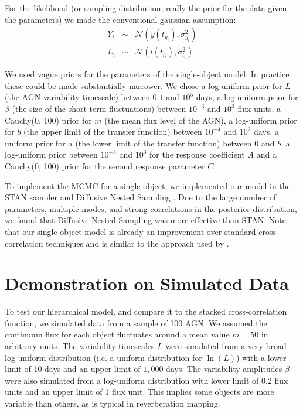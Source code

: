\documentclass[useAMS,usenatbib]{mn2e}
\begin{document}
For the likelihood (or sampling distribution, really the prior for the data
given the parameters) we made the conventional gaussian assumption:
\begin{eqnarray}
Y_i &\sim& \mathcal{N}\left(y(t_{y_i}), \sigma_{y_i}^2\right)\\
L_i &\sim& \mathcal{N}\left(l(t_{l_i}), \sigma_{l_i}^2\right)
\end{eqnarray}

We used vague priors for the parameters of the single-object model. In practice
these could be made substantially narrower.
We chose a log-uniform prior for $L$ (the AGN variability timescale)
between $0.1$ and $10^5$ days, a log-uniform
prior for $\beta$ (the size of the short-term fluctuations)
between $10^{-3}$ and $10^3$ flux units, a Cauchy(0, 100)
prior for $m$ (the mean flux level of the AGN), a log-uniform prior for $b$
(the upper limit of the transfer function) between $10^{-4}$ and $10^2$ days,
a uniform prior for $a$ (the lower limit of the transfer function)
between 0 and $b$, a log-uniform prior between
$10^{-3}$ and $10^3$ for the response coefficient $A$ and a Cauchy(0, 100) prior
for the second response parameter $C$.

To implement the MCMC for a single object,
we implemented our model in the STAN sampler \citep{nuts}
and Diffusive Nested Sampling \citep{dnest}. Due to the large number of
parameters, multiple modes, and strong correlations in the posterior distribution,
we found that Diffusive Nested Sampling was more effective than STAN.
Note that our single-object model is already an improvement over standard
cross-correlation techniques and is similar to the approach used by
\citet{2011ApJ...735...80Z}.

\section{Demonstration on Simulated Data}\label{sec:data}
To test our hierarchical model, and compare it to the stacked cross-correlation
function, we simulated data from a sample of 100 AGN. We assumed the
continuum flux for each object fluctuates around a mean value $m = 50$ in
arbitrary units. The variability timescales $L$ were simulated from a very
broad log-uniform distribution (i.e. a uniform distribution for $\ln(L)$)
with a lower limit of 10 days and an upper limit of $1,000$ days. The
variability amplitudes $\beta$ were also simulated from a log-uniform
distribution with lower limit of 0.2 flux units and an upper limit of 1 flux
unit. This implies some objects are more variable than others, as is typical
in reverberation mapping.
\end{document}
